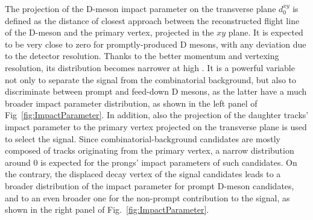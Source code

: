 The projection of the D-meson impact parameter on the transverse plane $d_0^{xy}$ is defined as the distance of closest approach between the reconstructed flight line of the D-meson and the primary vertex, projected in the $xy$ plane. It is expected to be very close to zero for promptly-produced D mesons, with any deviation due to the detector resolution. Thanks to the better momentum and vertexing resolution, its distribution becomes narrower at high \pt. It is a powerful variable not only to separate the signal from the combinatorial background, but also to discriminate between prompt and feed-down D mesons, as the latter have a much broader impact parameter distribution, as shown in the left panel of Fig~\ref{fig:ImpactParameter}. In addition, also the projection of the daughter tracks' impact parameter to the primary vertex projected on the transverse plane is used to select the signal. Since combinatorial-background candidates are mostly composed of tracks originating from the primary vertex, a narrow distribution around 0 is expected for the prongs' impact parameters of such candidates. On the contrary, the displaced decay vertex of the signal candidates leads to a broader distribution of the impact parameter for prompt D-meson candidates, and to an even broader one for the non-prompt contribution to the signal, as shown in the right panel of Fig.~\ref{fig:ImpactParameter}.

